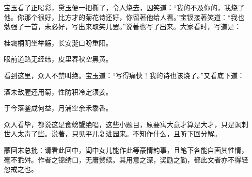 \begin{parag}
    宝玉看了正喝彩，黛玉便一把撕了，令人烧去，因笑道：“我的不及你的，我烧了他。你那个很好，比方才的菊花诗还好，你留著他给人看。”宝钗接著笑道：“我也勉强了一首，未必好，写出来取笑儿罢。”说著也写了出来。大家看时，写道是：
\end{parag}


\begin{poem}
    \begin{pl}

        桂霭桐阴坐举觞，长安涎口盼重阳。
    \end{pl}
    \begin{pl}

        眼前道路无经纬，皮里春秋空黑黄。
    \end{pl}
\end{poem}


\begin{parag}
    看到这里，众人不禁叫绝。宝玉道：“写得痛快！我的诗也该烧了。”又看底下道：
\end{parag}


\begin{poem}
    \begin{pl}

        酒未敌腥还用菊，性防积冷定须姜。
    \end{pl}
    \begin{pl}

        于今落釜成何益，月浦空余禾黍香。
    \end{pl}
\end{poem}


\begin{parag}
    众人看毕，都说这是食螃蟹绝唱，这些小题目，原要寓大意才算是大才，只是讽刺世人太毒了些。说著，只见平儿复进园来。不知作什么，且听下回分解。
\end{parag}


\begin{parag}
    \begin{note}蒙回末总批：请看此回中，闺中女儿能作此等豪情韵事，且笔下各能自画其性情，毫不乖舛。作者之锦绣口，无庸赘续。其用意之深，奖励之勤，都此文者亦不得轻忽戒之也。\end{note}
\end{parag}
